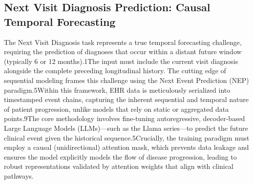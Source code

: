 \subsection{Next Visit Diagnosis Prediction: Causal Temporal Forecasting}
The Next Visit Diagnosis task represents a true temporal forecasting challenge, requiring the prediction of diagnoses that occur within a distant future window (typically 6 or 12 months).1The input must include the current visit diagnosis alongside the complete preceding longitudinal history.
The cutting edge of sequential modeling frames this challenge using the Next Event Prediction (NEP) paradigm.5Within this framework, EHR data is meticulously serialized into timestamped event chains, capturing the inherent sequential and temporal nature of patient progression, unlike models that rely on static or aggregated data points.9The core methodology involves fine-tuning autoregressive, decoder-based Large Language Models (LLMs)—such as the Llama series—to predict the future clinical event given the historical sequence.5Crucially, the training paradigm must employ a causal (unidirectional) attention mask, which prevents data leakage and ensures the model explicitly models the flow of disease progression, leading to robust representations validated by attention weights that align with clinical pathways.


